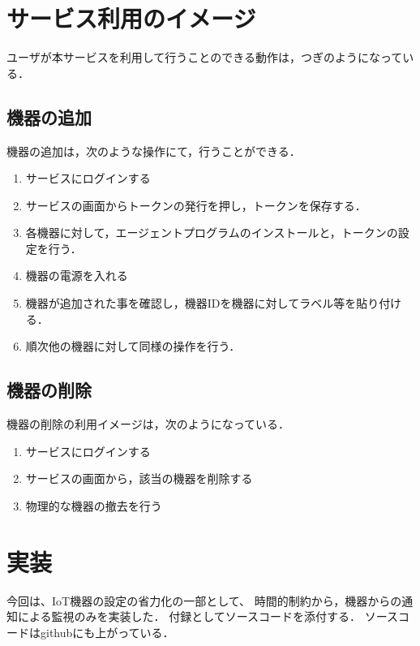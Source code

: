 \section{サービス利用のイメージ}
ユーザが本サービスを利用して行うことのできる動作は，つぎのようになっている．
\subsection{機器の追加}
機器の追加は，次のような操作にて，行うことができる．
\begin{enumerate}
\item サービスにログインする
\item サービスの画面からトークンの発行を押し，トークンを保存する．
\item 各機器に対して，エージェントプログラムのインストールと，トークンの設定を行う．
\item 機器の電源を入れる
\item 機器が追加された事を確認し，機器IDを機器に対してラベル等を貼り付ける．
\item 順次他の機器に対して同様の操作を行う．
\end{enumerate}

\subsection{機器の削除}
機器の削除の利用イメージは，次のようになっている．
\begin{enumerate}
\item サービスにログインする
\item サービスの画面から，該当の機器を削除する
\item 物理的な機器の撤去を行う
\end{enumerate}



\section{実装}
今回は、IoT機器の設定の省力化の一部として、
時間的制約から，機器からの通知による監視のみを実装した．
付録としてソースコードを添付する．
ソースコードはgithubにも上がっている．








